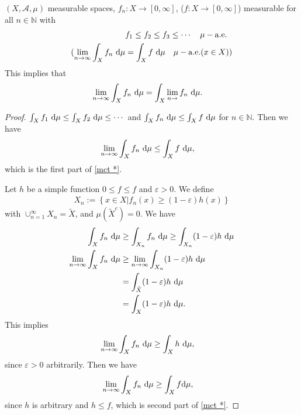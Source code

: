 \documentclass[../../note.tex]{subfiles}
\begin{document}
\begin{theorem}
    \label{thm: monotone convergence theorem}
    $(X, \mathcal{A}, \mu)$ measurable spaces, $f_n: X \rightarrow [0,\infty]$, ($f: X \rightarrow [0,\infty]$) measurable for all $n \in \mathbb{N}$ with
    \begin{align}
        &f_1 \leq f_2 \leq f_3 \leq \cdots~~~\mu-\mbox{a.e.}\\  
        (\lim_{n \rightarrow \infty} \int_X f_n~{\rm d}\mu
        &= \int_X f~{\rm d}\mu~~~\mu-\mbox{a.e.}(x \in X))
    \end{align}
    This implies that
    \begin{align}
        \lim_{n \rightarrow \infty} \int_X f_n~{\rm d}\mu 
        &= \int_X \lim_{n \rightarrow} f_n~{\rm d}\mu.
        \label{mct *}
    \end{align}
\end{theorem}
\begin{proof}
    $\int_X f_1~{\rm d}\mu \leq \int_X f_2~{\rm d}\mu \leq \cdots$ and $\int_X f_n~{\rm d}\mu \leq \int_X f~{\rm d}\mu$ for $n \in \mathbb{N}$. Then we have
    \begin{align}
        \lim_{n \rightarrow \infty} \int_X f_n~{\rm d}\mu 
        &\leq \int_X f~{\rm d}\mu,
    \end{align}
    which is the first part of \ref{mct *}.

    Let $h$ be a simple function $0 \leq f \leq f$ and $\varepsilon > 0$. We define 
    \begin{align}
        X_n:= \left\{x\in X \vert f_n(x) \geq (1-\varepsilon)h(x) \right\}
    \end{align}
    with $\cup_{n=1}^{\infty} X_n = \tilde{X}$, and $\mu(\tilde{X}^c) = 0$. We have
    \begin{align}
        \int_X f_n~{\rm d}\mu 
        &\geq \int_{X_n} f_n~{\rm d}\mu \geq \int_{X_n} (1-\varepsilon)h~{\rm d}\mu \\
        \lim_{n \rightarrow \infty} \int_X f_n~{\rm d}\mu
        &\geq \lim_{n \rightarrow \infty} \int_{X_n} (1-\varepsilon)h~{\rm d}\mu \\
        &= \int_{\tilde{X}} (1-\varepsilon)h~{\rm d}\mu \\
        &= \int_X (1-\varepsilon)h~{\rm d}\mu.
    \end{align}
    This implies
    \begin{align}
        \lim_{n \rightarrow \infty} \int_X f_n~{\rm d}\mu 
        &\geq \int_X h~{\rm d}\mu,
    \end{align}
    since $\varepsilon > 0$ arbitrarily. Then we have
    \begin{align}
        \lim_{n \rightarrow \infty} \int_X f_n~{\rm d}\mu 
        &\geq \int_X f{\rm d}\mu,
    \end{align}
    since $h$ is arbitrary and $h \leq f$, which is second part of \ref{mct *}.
\end{proof}
\end{document}
